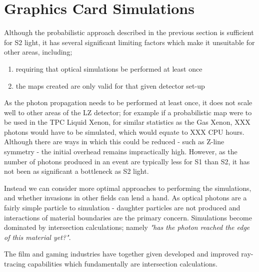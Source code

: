 \section{Graphics Card Simulations}

\par
Although the probabilistic approach described in the previous section is sufficient for S2 light, it has several significant limiting factors which make it unsuitable for other areas, including;
\begin{enumerate}
    \item requiring that optical simulations be performed at least once
    \item the maps created are only valid for that given detector set-up 
\end{enumerate}
As the photon propagation needs to be performed at least once, it does not scale well to other areas of the LZ detector; for example if a probabilistic map were to be used in the TPC Liquid Xenon, for similar statistics as the Gas Xenon, XXX photons would have to be simulated, which would equate to XXX CPU hours.
Although there are ways in which this could be reduced - such as Z-line symmetry - the initial overhead remains impractically high.
However, as the number of photons produced in an event are typically less for S1 than S2, it has not been as significant a bottleneck as S2 light.

\par
Instead we can consider more optimal approaches to performing the simulations, and whether invasions in other fields can lend a hand.
As optical photons are a fairly simple particle to simulation - daughter particles are not produced and interactions of material boundaries are the primary concern.
Simulations become dominated by intersection calculations; namely \textit{"has the photon reached the edge of this material yet?"}.

\par
The film and gaming industries have together given developed and improved ray-tracing capabilities which fundamentally are intersection calculations.


